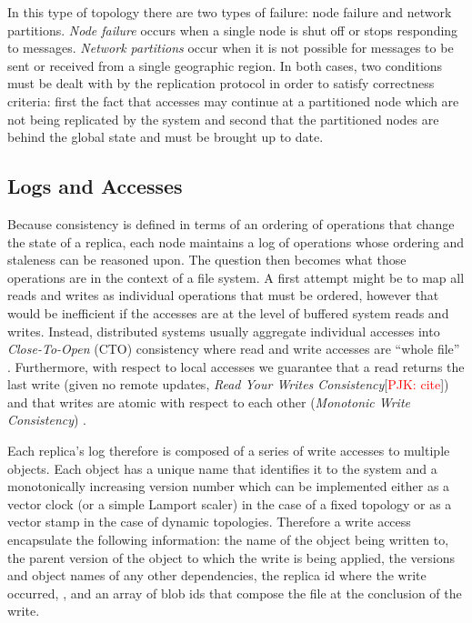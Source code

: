 \documentclass[10pt,conference,compsocconf,letterpaper]{IEEEtran}
\newcommand{\todo}[1]{{\textcolor{red}{#1}}}
\newcommand{\pjk}[1]{[\todo{PJK: #1}]}
\begin{document}
In this type of topology there are two types of failure: node failure and network partitions. \textit{Node failure} occurs when a single node is shut off or stops responding to messages. \textit{Network partitions} occur when it is not possible for messages to be sent or received from a single geographic region. In both cases, two conditions must be dealt with by the replication protocol in order to satisfy correctness criteria: first the fact that accesses may continue at a partitioned node which are not being replicated by the system and second that the partitioned nodes are behind the global state and must be brought up to date.

\subsection{Logs and Accesses}

Because consistency is defined in terms of an ordering of operations that change the state of a replica, each node maintains a log of operations whose ordering and staleness can be reasoned upon. The question then becomes what those operations are in the context of a file system. A first attempt might be to map all reads and writes as individual operations that must be ordered, however that would be inefficient if the accesses are at the level of buffered system reads and writes. Instead, distributed systems usually aggregate individual accesses into \textit{Close-To-Open} (CTO) consistency where read and write accesses are ``whole file'' \cite{muthitacharoen_low-bandwidth_2001}. Furthermore, with respect to local accesses we guarantee that a read returns the last write (given no remote updates, \textit{Read Your Writes Consistency}\pjk{cite}) and that writes are atomic with respect to each other (\textit{Monotonic Write Consistency}) \cite{bermbach_consistency_2013}.

Each replica's log therefore is composed of a series of write accesses to multiple objects. Each object has a unique name that identifies it to the system and a monotonically increasing version number which can be implemented either as a vector clock \cite{parker_detection_1983} (or a simple Lamport scaler) in the case of a fixed topology or as a vector stamp \cite{almeida_version_2002} in the case of dynamic topologies. Therefore a write access encapsulate the following information: the name of the object being written to, the parent version of the object to which the write is being applied, the versions and object names of any other dependencies, the replica id where the write occurred, , and an array of blob ids that compose the file at the conclusion of the write.
\end{document}
